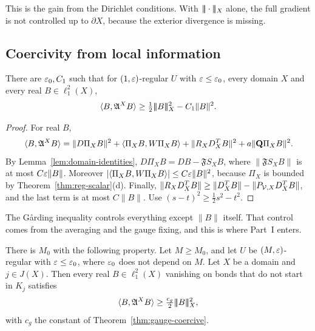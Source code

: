 This is the gain from the Dirichlet conditions. With $|\!|\!|\cdot|\!|\!|_X$ alone, the full gradient is not controlled up to $\partial X$, because the exterior divergence is missing.

\subsection{Coercivity from local information}\label{ss:19.2}

\begin{lemma}\label{lem:garding}
There are $\varepsilon_0,C_1$ such that for $(1,\varepsilon)$-regular $U$ with $\varepsilon\le\varepsilon_0$, every domain $X$ and every real $B\in\ell^2_1(X)$,
\[
\langle B,\mathfrak A^XB\rangle\ge\tfrac12|\!|\!|B|\!|\!|_X^2-C_1\|B\|^2 .
\]
\end{lemma}

\begin{proof}
For real $B$,
\[
\langle B,\mathfrak A^XB\rangle=\|D\Pi_XB\|^2+\langle \Pi_XB,W\Pi_XB\rangle+\|R_XD^T_XB\|^2+a\|\mathbf Q\Pi_XB\|^2 .
\]
By Lemma~\ref{lem:domain-identities}, $D\Pi_XB=DB-\mathfrak FS_XB$, where $\|\mathfrak FS_XB\|$ is at most $C\varepsilon\|B\|$. Moreover $|\langle \Pi_XB,W\Pi_XB\rangle|\le C\varepsilon\|B\|^2$, because $\Pi_X$ is bounded by Theorem~\ref{thm:reg-scalar}(d). Finally, $\|R_XD^T_XB\|\ge\|D^T_XB\|-\|P_{\mathcal V,X}D^T_XB\|$, and the last term is at most $C\|B\|$. Use $(s-t)^2\ge\frac12s^2-t^2$.
\end{proof}

The G\aa rding inequality controls everything except $\|B\|$ itself. That control comes from the averaging and the gauge fixing, and this is where Part~I enters.

\begin{lemma}\label{lem:local-coercive}
There is $M_0$ with the following property. Let $M\ge M_0$, and let $U$ be $(M,\varepsilon)$-regular with $\varepsilon\le\varepsilon_0$, where $\varepsilon_0$ does not depend on $M$. Let $X$ be a domain and $j\in J(X)$. Then every real $B\in\ell^2_1(X)$ vanishing on bonds that do not start in $K_j$ satisfies
\[
\langle B,\mathfrak A^XB\rangle\ge\tfrac{c_g}2|\!|\!|B|\!|\!|_X^2 ,
\]
with $c_g$ the constant of Theorem~\ref{thm:gauge-coercive}.
\end{lemma}

